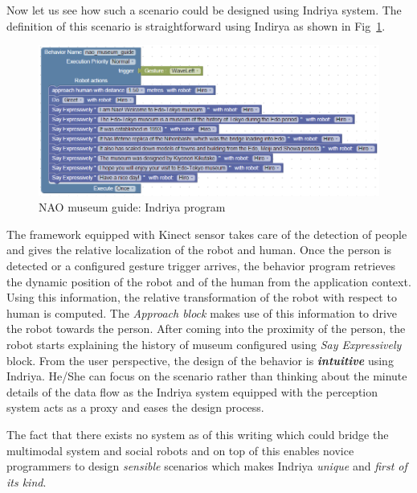 Now let us see how such a scenario could be designed using Indriya system. The definition of this scenario is straightforward using Indirya as shown in Fig~\ref{fig:scenario1_program}.
\begin{figure}[H]
\centering
\includegraphics[width=\textwidth]{../thesis/assets/scenario1_new.png}
\caption[NAO museum guide: Indriya program]{NAO museum guide: Indriya program}
\label{fig:scenario1_program}
\end{figure}
The framework equipped with Kinect sensor takes care of the detection of people and gives the relative localization of the robot and human. Once the person is detected or a configured gesture trigger arrives, the behavior program retrieves the dynamic position of the robot and of the human from the application context. Using this information, the relative transformation of the robot with respect to human is computed. The \emph{Approach block} makes use of this information to drive the robot towards the person. After coming into the proximity of the person, the robot starts explaining the history of museum configured using \emph{Say Expressively} block. From the user perspective, the design of the behavior is \textbf{\emph{intuitive}} using Indriya. He/She can focus on the scenario rather than thinking about the minute details of the data flow as the Indriya system equipped with the perception system acts as a proxy and eases the design process. 

The fact that there exists no system as of this writing which could bridge the multimodal system and social robots and on top of this enables novice programmers to design \emph{sensible} scenarios which makes Indriya \emph{unique} and \emph{first of its kind}.
